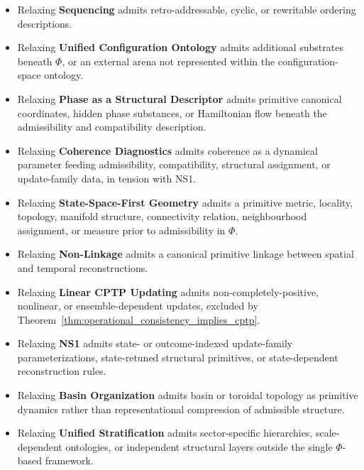 \documentclass[aps,prx,onecolumn,11pt]{revtex4-2}
\theoremstyle{plain}
\theoremstyle{definition}
\theoremstyle{remark}
\begin{document}
\begin{itemize}[leftmargin=*]

\item Relaxing \textbf{Sequencing} admits retro-addressable, cyclic, or
rewritable ordering descriptions.

\item Relaxing \textbf{Unified Configuration Ontology} admits additional
substrates beneath \(\Phi\), or an external arena not represented within
the configuration-space ontology.

\item Relaxing \textbf{Phase as a Structural Descriptor} admits
primitive canonical coordinates, hidden phase substances, or Hamiltonian
flow beneath the admissibility and compatibility description.

\item Relaxing \textbf{Coherence Diagnostics} admits coherence as a
dynamical parameter feeding admissibility, compatibility, structural
assignment, or update-family data, in tension with NS1.

\item Relaxing \textbf{State-Space-First Geometry} admits a primitive
metric, locality, topology, manifold structure, connectivity relation,
neighbourhood assignment, or measure prior to admissibility in \(\Phi\).

\item Relaxing \textbf{Non-Linkage} admits a canonical primitive linkage
between spatial and temporal reconstructions.

\item Relaxing \textbf{Linear CPTP Updating} admits
non-completely-positive, nonlinear, or ensemble-dependent updates,
excluded by Theorem~\ref{thm:operational_consistency_implies_cptp}.

\item Relaxing \textbf{NS1} admits state- or outcome-indexed
update-family parameterizations, state-retuned structural primitives,
or state-dependent reconstruction rules.

\item Relaxing \textbf{Basin Organization} admits basin or toroidal
topology as primitive dynamics rather than representational compression
of admissible structure.

\item Relaxing \textbf{Unified Stratification} admits sector-specific
hierarchies, scale-dependent ontologies, or independent structural
layers outside the single \(\Phi\)-based framework.

\end{itemize}
\end{document}
